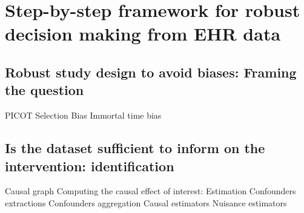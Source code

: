 \documentclass[french,12pt,twoside,a4paper]{book}
\begin{document}
\section{Step-by-step framework for robust decision making from EHR data}%
\label{sec:causal_tuto:framework}%

\subsection{Robust study design to avoid biases: Framing the question}%
\label{subsec:causal_tuto:framing}%

PICOT
Selection Bias
Immortal time bias

\subsection{Is the dataset sufficient to inform on the intervention: identification}%
\label{subsec:causal_tuto:identification}%
Causal graph Computing the causal effect of interest: Estimation Confounders
extractions Confounders aggregation Causal estimators Nuisance estimators
\end{document}
